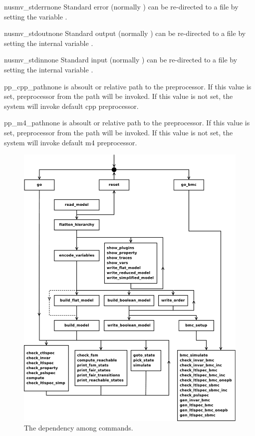 \begin{nusmvVar} {nusmv\_stderr}{}{none}
Standard error (normally ) can be re-directed to a file
by setting the variable .
\end{nusmvVar}

\begin{nusmvVar} {nusmv\_stdout}{}{none}
Standard output (normally ) can be re-directed to a file
by setting the internal variable .
\end{nusmvVar}

\begin{nusmvVar} {nusmv\_stdin}{}{none}
Standard input (normally ) can be re-directed to a file
by setting the internal variable .
\end{nusmvVar}

\begin{nusmvVar} {pp\_cpp\_path}{}{none}
 is absoult or relative path to the preprocessor.
If this value is set, preprocessor from the path will be invoked.
If this value is not set, the system will invoke default cpp preprocessor. 
\end{nusmvVar}

\begin{nusmvVar} {pp\_m4\_path}{}{none}
 is absoult or relative path to the preprocessor.
If this value is set, preprocessor from the path will be invoked.
If this value is not set, the system will invoke default m4 preprocessor. 
\end{nusmvVar}

\begin{figure}[t]
\label{flowchart}
\begin{center}
\includegraphics[width=\textwidth]{cmdpo}
\caption{The dependency among \nusmv commands.}
\end{center}
\end{figure}
